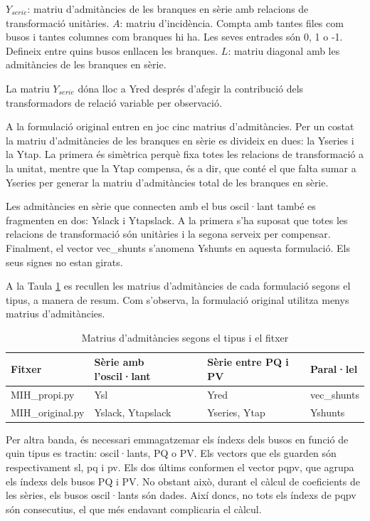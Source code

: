 $Y_{serie}$: matriu d'admitàncies de les branques en sèrie amb relacions de transformació unitàries.
\vs
$A$: matriu d'incidència. Compta amb tantes files com busos i tantes columnes com branques hi ha. Les seves entrades són 0, 1 o -1. Defineix entre quins busos enllacen les branques.
\vs
$L$: matriu diagonal amb les admitàncies de les branques en sèrie.

La matriu $Y_{serie}$ dóna lloc a Yred després d'afegir la contribució dels transformadors de relació variable per observació.

A la formulació original entren en joc cinc matrius d'admitàncies. Per un costat la matriu d'admitàncies de les branques en sèrie es divideix en dues: la Yseries i la Ytap. La primera és simètrica perquè fixa totes les relacions de transformació a la unitat, mentre que la Ytap compensa, és a dir, que conté el que falta sumar a Yseries per generar la matriu d'admitàncies total de les branques en sèrie.

Les admitàncies en sèrie que connecten amb el bus oscil·lant també es fragmenten en dos: Yslack i Ytapslack. A la primera s'ha suposat que totes les relacions de transformació són unitàries i la segona serveix per compensar. Finalment, el vector vec\_shunts s'anomena Yshunts en aquesta formulació. Els seus signes no estan girats. 

A la Taula \ref{tab:Fitxersmat} es recullen les matrius d'admitàncies de cada formulació segons el tipus, a manera de resum. Com s'observa, la formulació original utilitza menys matrius d'admitàncies. %

\begin{table}[!htb]
    \begin{center}
    \begin{tabular}{llll}
    \hline
    Fitxer & Sèrie amb l'oscil·lant & Sèrie entre PQ i PV & Paral·lel\\
    \hline
    \hline
    MIH\_propi.py & Ysl & Yred & vec\_shunts \\
    MIH\_original.py & Yslack, Ytapslack & Yseries, Ytap & Yshunts \\
    \hline 
    \end{tabular}
    \caption{Matrius d'admitàncies segons el tipus i el fitxer}
    \label{tab:Fitxersmat}
    \end{center}
  \end{table}

Per altra banda, és necessari emmagatzemar els índexs dels busos en funció de quin tipus es tractin: oscil·lants, PQ o PV. Els vectors que els guarden són respectivament sl, pq i pv. Els dos últims conformen el vector pqpv, que agrupa els índexs dels busos PQ i PV. No obstant això, durant el càlcul de coeficients de les sèries, els busos oscil·lants són dades. Així doncs, no tots els índexs de pqpv són consecutius, el que més endavant complicaria el càlcul. 

